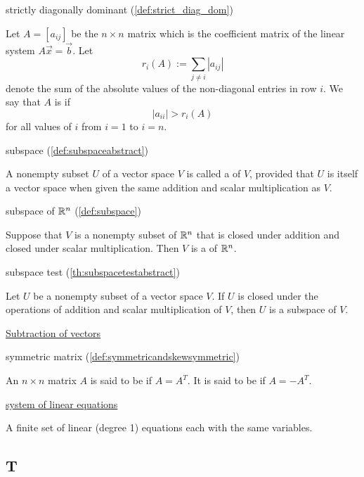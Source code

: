 \documentclass{ximera}
\begin{document}
strictly diagonally dominant (\ref{def:strict_diag_dom})
\begin{expandable}
    Let $A=[a_{ij}]$ be the $n\times n$ matrix which is the coefficient matrix of the linear system $A \vec{x}= \vec{b}$.  Let
$$
r_i(A):= \sum_{j \ne i} |a_{ij}|
$$
denote the sum of the absolute values of the non-diagonal entries in row $i$.  We say that $A$ is  if 
$$|a_{ii}|>r_i(A)$$
for all values of $i$ from $i=1$ to $i=n$.
\end{expandable}


subspace (\ref{def:subspaceabstract})
\begin{expandable}
    A nonempty subset $U$ of a vector space $V$ is called a  of $V$, provided that $U$ is itself a vector space when given the same addition and scalar multiplication as $V$.
\end{expandable}

subspace of $\mathbb{R}^n$ (\ref{def:subspace})
\begin{expandable}
    Suppose that $V$ is a nonempty subset of $\mathbb{R}^n$ that is closed under addition and closed under scalar multiplication.  Then $V$ is a  of $\mathbb{R}^n$.
\end{expandable}

subspace test (\ref{th:subspacetestabstract})
\begin{expandable}
    Let $U$ be a nonempty subset of a vector space $V$.  If $U$ is closed under the operations of addition and scalar multiplication of $V$, then $U$ is a subspace of $V$.
\end{expandable}

\href{https://ximera.osu.edu/oerlinalg/LinearAlgebra/VEC-0030/main}{Subtraction of vectors}

symmetric matrix (\ref{def:symmetricandskewsymmetric})
\begin{expandable}
    An $n\times n$ matrix $A$ is said to be
 if $A=A^{T}.$ It is said to be
 if $A=-A^{T}.$
\end{expandable}

\href{https://ximera.osu.edu/oerlinalg/LinearAlgebra/SYS-0010/main}{system of linear equations}
\begin{expandable}
    A finite set of linear (degree 1) equations each with the same variables.
\end{expandable}


\subsection{T}
\end{document}
